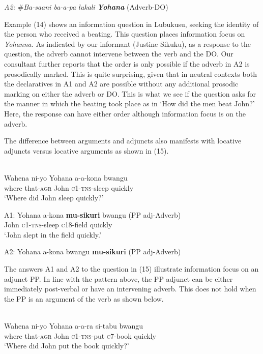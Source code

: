 \documentclass[output=paper]{langsci/langscibook}
\begin{document}
\glt \textit{A2:}  \#\textit{Ba-saani  ba-a-pa  lukali}    \textbf{\textit{Yohana}}  (Adverb-DO)  
\z


Example (14) shows an information question in Lubukusu, seeking the identity of the person who received a beating. This question places information focus on \textit{Yohanna.} As indicated by our informant (Justine Sikuku), as a response to the question, the adverb cannot intervene between the verb and the DO. Our consultant further reports that the order is only possible if the adverb in A2 is prosodically marked. This is quite surprising, given that in neutral contexts both the declaratives in A1 and A2 are possible without any additional prosodic marking on either the adverb or DO. This is what we see if the question asks for the manner in which the beating took place as in ‘How did the men beat John?’ Here, the response can have either order although information focus is on the adverb. 

  The difference between arguments and adjuncts also manifests with locative adjuncts versus locative arguments as shown in (15).  


\ea\label{ex:}
  \\
\gll Wahena  ni-yo    Yohana  a-a-kona  bwangu \\
where     that-\textsc{agr}   John     \textsc{c1-tns}-sleep  quickly \\
\glt ‘Where did John sleep quickly?’ \\
\z

\ea\label{ex:}
\gll A1:  {Yohana  a-kona}    \textbf{{mu-sikuri}}{   bwangu}  (PP adj-Adverb) \\
       John     \textsc{c1-tns}-sleep  \textsc{c}18-field   quickly   \\
\glt   ‘John slept in the field quickly.’

 A2:  Yohana  a-kona    bwangu  \textbf{mu-sikuri}  (PP adj-Adverb)\\
\z


The answers A1 and A2 to the question in (15) illustrate information focus on an adjunct PP. In line with the pattern above, the PP adjunct can be either immediately post-verbal or have an intervening adverb. This does not hold when the PP is an argument of the verb as shown below.  


\ea\label{ex:}
\\
\gll Wahena  ni-yo    Yohana   a-a-ra     si-tabu          bwangu \\
where     that-\textsc{agr}   John     \textsc{c1-tns}-put   \textsc{c}7-book       quickly \\
\glt ‘Where did John put the book quickly?’  
\z
\end{document}
